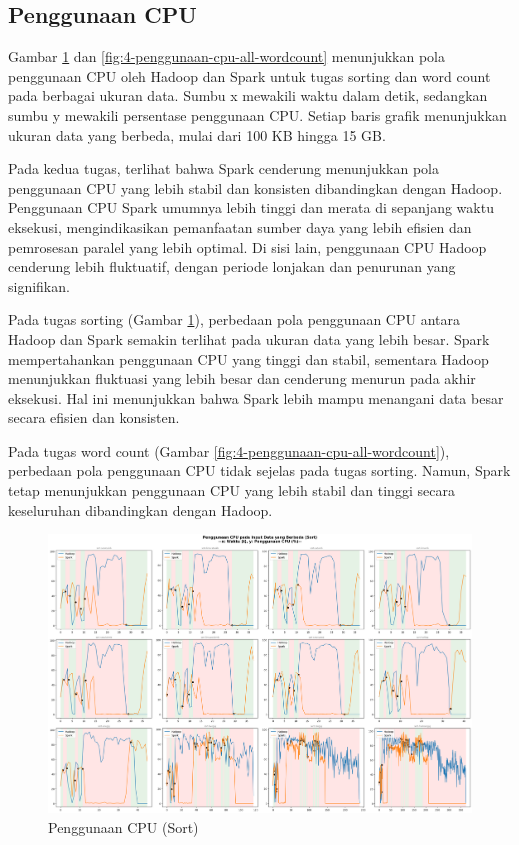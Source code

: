 \subsection{Penggunaan CPU}
Gambar \ref{fig:4-penggunaan-cpu-all-sort} dan \ref{fig:4-penggunaan-cpu-all-wordcount} menunjukkan pola penggunaan CPU oleh Hadoop dan Spark untuk tugas sorting dan word count pada berbagai ukuran data. Sumbu x mewakili waktu dalam detik, sedangkan sumbu y mewakili persentase penggunaan CPU. Setiap baris grafik menunjukkan ukuran data yang berbeda, mulai dari 100 KB hingga 15 GB.

Pada kedua tugas, terlihat bahwa Spark cenderung menunjukkan pola penggunaan CPU yang lebih stabil dan konsisten dibandingkan dengan Hadoop. Penggunaan CPU Spark umumnya lebih tinggi dan merata di sepanjang waktu eksekusi, mengindikasikan pemanfaatan sumber daya yang lebih efisien dan pemrosesan paralel yang lebih optimal. Di sisi lain, penggunaan CPU Hadoop cenderung lebih fluktuatif, dengan periode lonjakan dan penurunan yang signifikan. 

Pada tugas sorting (Gambar \ref{fig:4-penggunaan-cpu-all-sort}), perbedaan pola penggunaan CPU antara Hadoop dan Spark semakin terlihat pada ukuran data yang lebih besar. Spark mempertahankan penggunaan CPU yang tinggi dan stabil, sementara Hadoop menunjukkan fluktuasi yang lebih besar dan cenderung menurun pada akhir eksekusi. Hal ini menunjukkan bahwa Spark lebih mampu menangani data besar secara efisien dan konsisten. 

Pada tugas word count (Gambar \ref{fig:4-penggunaan-cpu-all-wordcount}), perbedaan pola penggunaan CPU tidak sejelas pada tugas sorting. Namun, Spark tetap menunjukkan penggunaan CPU yang lebih stabil dan tinggi secara keseluruhan dibandingkan dengan Hadoop. 

\begin{figure}[h]
    \centering
    \includegraphics[width=1\textwidth]{figures/ch04/4-penggunaan-cpu-all-sort.png}
    \caption{Penggunaan CPU (Sort)}
    \label{fig:4-penggunaan-cpu-all-sort}
\end{figure}

